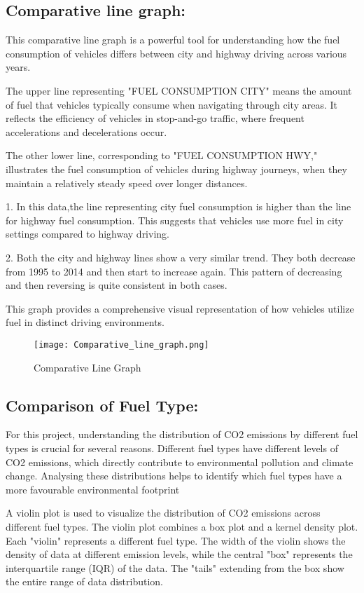 \documentclass[12pt, a4paper,oneside]{book}
\numberwithin{equation}{section}
\begin{document}
\subsection{Comparative line graph:}


This comparative line graph is a powerful tool for understanding how the fuel consumption of vehicles differs between city and highway driving across various years.

The upper line representing "FUEL CONSUMPTION CITY" means the amount of fuel that vehicles typically consume when navigating through city areas. It reflects the efficiency of vehicles in stop-and-go traffic, where frequent accelerations and decelerations occur.

The other lower line, corresponding to "FUEL CONSUMPTION HWY," illustrates the fuel consumption of vehicles during highway journeys, when they maintain a relatively steady speed over longer distances. 

1. In this data,the line representing city fuel consumption is higher than the line for highway fuel consumption. This suggests that vehicles use more fuel in city settings compared to highway driving.

2. Both the city and highway lines show a very similar trend. They both decrease from 1995 to 2014 and then start to increase again. This pattern of decreasing and then reversing is quite consistent in both cases.

This graph provides a comprehensive visual representation of how vehicles utilize fuel in distinct driving environments.


 \begin{figure}[H]
\centerline{\texttt{[image: Comparative\_line\_graph.png]}}
\caption{Comparative Line Graph}
\label{fig:4.2}
\end{figure}

\newpage
\subsection{Comparison of Fuel Type:}


For this project, understanding the distribution of CO2 emissions by different fuel types is crucial for several reasons. Different fuel types have different levels of CO2 emissions, which directly contribute to environmental pollution and climate change. Analysing these distributions helps to identify which fuel types have a more favourable environmental footprint

A violin plot is used to visualize the distribution of CO2 emissions across different fuel types. The violin plot combines a box plot and a kernel density plot. Each "violin" represents a different fuel type. The width of the violin shows the density of data at different emission levels, while the central "box" represents the interquartile range (IQR) of the data. The "tails" extending from the box show the entire range of data distribution.
\end{document}
